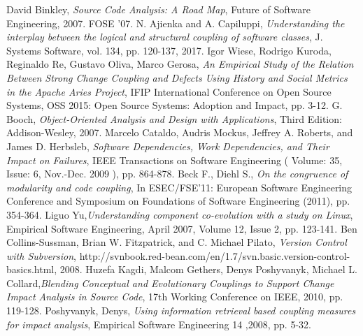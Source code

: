 \documentclass[12pt,a4paper,oneside]{report}
\begin{document}


\tableofcontents

\newpage














\begin{thebibliography}{1}

David Binkley, \emph{Source Code Analysis: A Road Map}, Future of Software Engineering, 2007. FOSE '07.
N. Ajienka and A. Capiluppi, \emph{Understanding the interplay between the logical and structural coupling of software classes}, J. Systems Software, vol. 134, pp. 120-137, 2017.
Igor Wiese, Rodrigo Kuroda, Reginaldo Re, Gustavo Oliva, Marco Gerosa, \emph{An Empirical Study of the Relation Between Strong Change Coupling and Defects Using History and Social Metrics in the Apache Aries Project}, IFIP International Conference on Open Source Systems, OSS 2015: Open Source Systems: Adoption and Impact, pp. 3-12.
G. Booch, \emph{Object-Oriented Analysis and Design with Applications}, Third Edition: Addison-Wesley, 2007.
Marcelo Cataldo, Audris Mockus, Jeffrey A. Roberts, and James D. Herbsleb, \emph{Software Dependencies, Work Dependencies, and Their Impact on Failures},  IEEE Transactions on Software Engineering ( Volume: 35, Issue: 6, Nov.-Dec. 2009 ), pp. 864-878.
Beck F., Diehl S.,\emph{ On the congruence of modularity and code coupling}, In ESEC/FSE'11: European Software Engineering Conference and Symposium on Foundations of Software Engineering (2011), pp. 354-364.
Liguo Yu,\emph{Understanding component co-evolution with a study on Linux}, Empirical Software Engineering, April 2007, Volume 12, Issue 2, pp. 123-141.
 Ben Collins-Sussman, Brian W. Fitzpatrick, and C. Michael Pilato, \emph{Version Control with Subversion}, http://svnbook.red-bean.com/en/1.7/svn.basic.version-control-basics.html, 2008.
 Huzefa Kagdi, Malcom Gethers, Denys Poshyvanyk, Michael L. Collard,\emph{Blending Conceptual and Evolutionary Couplings to Support Change Impact Analysis in Source Code}, 17th Working Conference on IEEE, 2010, pp. 119-128.
Poshyvanyk, Denys, \emph{Using information retrieval based coupling measures for impact analysis}, Empirical Software Engineering 14 ,2008, pp. 5-32.

\end{thebibliography}
\end{document}
